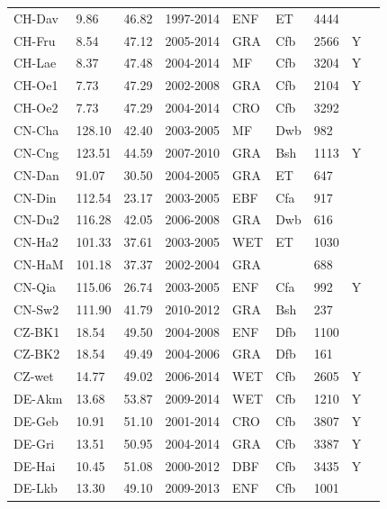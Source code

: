 \documentclass{myreport}
\begin{document}
\begin{longtable}{lllllllll}
  CH-Dav & 9.86 & 46.82 & 1997-2014 & ENF & ET & 4444 &  & \cite{CH-Dav} \\ 
  CH-Fru & 8.54 & 47.12 & 2005-2014 & GRA & Cfb & 2566 & Y & \cite{CH-Fru} \\ 
  CH-Lae & 8.37 & 47.48 & 2004-2014 & MF & Cfb & 3204 & Y & \cite{CH-Lae} \\ 
  CH-Oe1 & 7.73 & 47.29 & 2002-2008 & GRA & Cfb & 2104 & Y & \cite{CH-Oe1} \\ 
  CH-Oe2 & 7.73 & 47.29 & 2004-2014 & CRO & Cfb & 3292 &  & \cite{CH-Oe2} \\ 
  CN-Cha & 128.10 & 42.40 & 2003-2005 & MF & Dwb & 982 &  & \cite{CN-Cha} \\ 
  CN-Cng & 123.51 & 44.59 & 2007-2010 & GRA & Bsh & 1113 & Y & \cite{CN-Cng} \\ 
  CN-Dan & 91.07 & 30.50 & 2004-2005 & GRA & ET & 647 &  & \cite{CN-Dan} \\ 
  CN-Din & 112.54 & 23.17 & 2003-2005 & EBF & Cfa & 917 &  & \cite{CN-Din} \\ 
  CN-Du2 & 116.28 & 42.05 & 2006-2008 & GRA & Dwb & 616 &  & \cite{CN-Du2} \\ 
  CN-Ha2 & 101.33 & 37.61 & 2003-2005 & WET & ET & 1030 &  & \cite{CN-Ha2} \\ 
  CN-HaM & 101.18 & 37.37 & 2002-2004 & GRA &  & 688 &  & \cite{CN-HaM} \\ 
  CN-Qia & 115.06 & 26.74 & 2003-2005 & ENF & Cfa & 992 & Y & \cite{CN-Qia} \\ 
  CN-Sw2 & 111.90 & 41.79 & 2010-2012 & GRA & Bsh & 237 &  & \cite{CN-Sw2} \\ 
  CZ-BK1 & 18.54 & 49.50 & 2004-2008 & ENF & Dfb & 1100 &  & \cite{CZ-BK1} \\ 
  CZ-BK2 & 18.54 & 49.49 & 2004-2006 & GRA & Dfb & 161 &  & \cite{CZ-BK2} \\ 
  CZ-wet & 14.77 & 49.02 & 2006-2014 & WET & Cfb & 2605 & Y & \cite{CZ-wet} \\ 
  DE-Akm & 13.68 & 53.87 & 2009-2014 & WET & Cfb & 1210 & Y & \cite{DE-Akm} \\ 
  DE-Geb & 10.91 & 51.10 & 2001-2014 & CRO & Cfb & 3807 & Y & \cite{DE-Geb} \\ 
  DE-Gri & 13.51 & 50.95 & 2004-2014 & GRA & Cfb & 3387 & Y & \cite{DE-Gri} \\ 
  DE-Hai & 10.45 & 51.08 & 2000-2012 & DBF & Cfb & 3435 & Y & \cite{DE-Hai} \\ 
  DE-Lkb & 13.30 & 49.10 & 2009-2013 & ENF & Cfb & 1001 &  & \cite{DE-Lkb} \\ 

\end{longtable}
\end{document}
